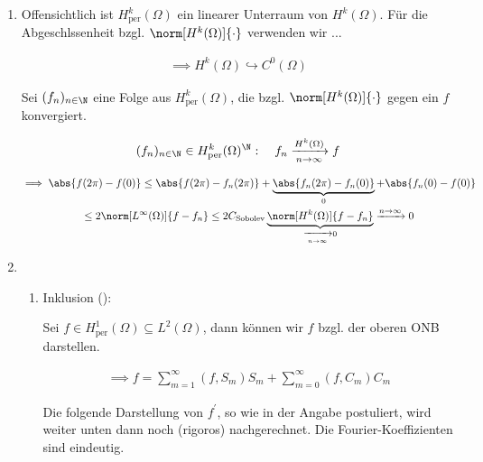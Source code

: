 \begin{solution}

\phantom{}

\begin{enumerate}[label = (\roman*)]

  \item Offensichtlich ist $H_\mathrm{per}^k(\Omega)$ ein linearer Unterraum von $H^k(\Omega)$.
  Für die Abgeschlssenheit bzgl. $\norm[H^k(\Omega)]{\cdot}$ verwenden wir ...


  \begin{align*}
    \implies
    H^k(\Omega) \hookrightarrow C^0(\Omega)
  \end{align*}

  Sei $(f_n)_{n \in \N}$ eine Folge aus $H_\mathrm{per}^k(\Omega)$, die bzgl. $\norm[H^k(\Omega)]{\cdot}$ gegen ein $f$ konvergiert.

  \begin{align*}
    (f_n)_{n \in \N} \in H_\mathrm{per}^k(\Omega)^\N:
    \quad
    f_n \xrightarrow[n \to \infty]{H^k(\Omega)} f
  \end{align*}

  \begin{multline*}
    \implies
    \abs{f(2 \pi) - f(0)}
    \leq
    \abs{f(2 \pi) - f_n(2 \pi)} + \underbrace{\abs{f_n(2 \pi) - f_n(0)}}_0 + \abs{f_n(0) - f(0)} \\
    \leq
    2 \norm[L^\infty(\Omega)]{f - f_n}
    \leq
    2 C_\mathrm{Sobolev} \underbrace{\norm[H^k(\Omega)]{f - f_n}}_{\xrightarrow[n \to \infty]{} 0}
    \xrightarrow[]{n \to \infty}
    0
  \end{multline*}

  \item

  \begin{enumerate}

    \item Inklusion (\Quote{$\subseteq$}):

    Sei $f \in H_\mathrm{per}^1(\Omega) \subseteq L^2(\Omega)$, dann können wir $f$ bzgl. der oberen ONB darstellen.

    \begin{align*}
      \implies
      f
      =
      \sum_{m=1}^\infty (f, S_m) S_m + \sum_{m=0}^\infty (f, C_m) C_m
    \end{align*}

    Die folgende Darstellung von $f^\prime$, so wie in der Angabe postuliert, wird weiter unten dann noch (rigoros) nachgerechnet.
    Die Fourier-Koeffizienten sind eindeutig.


\end{enumerate}
\end{enumerate}
\end{solution}
